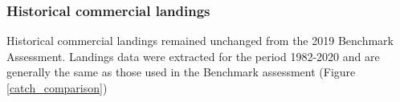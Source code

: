 \documentclass[11pt,
  english,
  a4paper,
]{article}
\begin{document}
\leavevmode\tagmcend\tagstructend


\hypertarget{historical-commercial-landings}{%
\subsubsection{Historical commercial landings}\label{historical-commercial-landings}}

\leavevmode\tagmcend\tagstructend

Historical commercial landings remained unchanged from the 2019 Benchmark Assessment. Landings data were extracted for the period 1982-2020 and are generally the same as those used in the Benchmark assessment (Figure \ref{catch_comparison})

\end{document}
